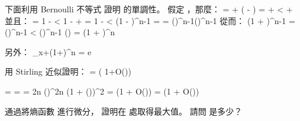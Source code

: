 下面利用 Bernoulli 不等式  證明  的單調性。
假定 ，那麼：
\startformula\startmathalignment
\NC {} \NC =  + \left( - \right) \NR
\NC \NC =  +  \NR
\NC \NC <  +  \NR
\stopmathalignment\stopformula
並且：
\startformula\startmathalignment
\NC {} \NC = 1 -  \NR
\NC \NC < 1 -  +  \NR
\NC \NC = 1 -  \NR
\NC \NC < \left(1 - \right)^{n-1} \qquad {} \NR
\NC \NC =  \NR
\NC \NC = \left(\right)^{n-1}\left(\right)^{n-1} \NR
\stopmathalignment\stopformula
從而：
\startformula\startmathalignment
\NC \left(1 + \right)^{n-1}
    \NC = \left(\right)^{n-1} \NR
\NC \NC < \left(\right)^{n-1} \left(\right) \NR
\NC \NC = \left(1 + \right)^n \NR
\stopmathalignment\stopformula

另外：
\startformula
\lim_{x\rightarrow +\infty}\left(1+\right)^n = e
\stopformula
\stopANSWER

\startEXERCISE[exercise:c_2n_n]\DIFFICULT
用 Stirling 近似證明：
\startformula
{} = 
               \left( 1+O\left(\right)\right) 
\stopformula
\stopEXERCISE

\startANSWER
\startformula\startmathalignment
\NC {} \NC =  =  \NR
\NC \NC = 
               {2\pi n \left(\right)^{2n}
                \left(1 + \Theta\left(\right)\right)^2} \NR
\NC \NC = 
          \left(1 + O\left(\right)\right) \NR
\NC \NC = 
	  \left(1 + O\left(\right)\right) \NR
\stopmathalignment\stopformula
\stopANSWER

\startEXERCISE\DIFFICULT
通過將熵函數  進行微分，
證明在  處取得最大值。
請問  是多少？
\stopEXERCISE

\startANSWER
\stopANSWER

\startEXERCISE
\stopEXERCISE

\startANSWER
\stopANSWER

\stopsection
